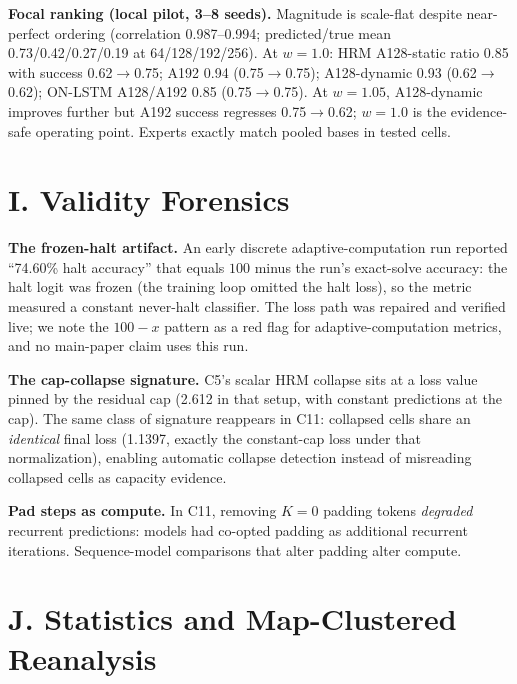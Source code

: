 \documentclass[letterpaper]{article} %
\newcommand{\stage}[1]{\textsc{#1}}
\begin{document}
\textbf{Focal ranking (local pilot, 3--8 seeds).} Magnitude is scale-flat despite near-perfect ordering (correlation 0.987--0.994; predicted/true mean 0.73/0.42/0.27/0.19 at 64/128/192/256). At $w{=}1.0$: HRM A128-static ratio 0.85 with success 0.62$\to$0.75; A192 0.94 (0.75$\to$0.75); A128-dynamic 0.93 (0.62$\to$0.62); ON-LSTM A128/A192 0.85 (0.75$\to$0.75). At $w{=}1.05$, A128-dynamic improves further but A192 success regresses 0.75$\to$0.62; $w{=}1.0$ is the evidence-safe operating point. Experts exactly match pooled bases in tested cells.

\section{I. Validity Forensics}

\textbf{The frozen-halt artifact.} An early discrete adaptive-computation run reported ``74.60\% halt accuracy'' that equals $100$ minus the run's exact-solve accuracy: the halt logit was frozen (the training loop omitted the halt loss), so the metric measured a constant never-halt classifier. The loss path was repaired and verified live; we note the $100{-}x$ pattern as a red flag for adaptive-computation metrics, and no main-paper claim uses this run.

\textbf{The cap-collapse signature.} \stage{C5}'s scalar HRM collapse sits at a loss value pinned by the residual cap (2.612 in that setup, with constant predictions at the cap). The same class of signature reappears in \stage{C11}: collapsed cells share an \emph{identical} final loss (1.1397, exactly the constant-cap loss under that normalization), enabling automatic collapse detection instead of misreading collapsed cells as capacity evidence.

\textbf{Pad steps as compute.} In \stage{C11}, removing $K{=}0$ padding tokens \emph{degraded} recurrent predictions: models had co-opted padding as additional recurrent iterations. Sequence-model comparisons that alter padding alter compute.

\section{J. Statistics and Map-Clustered Reanalysis}
\end{document}

